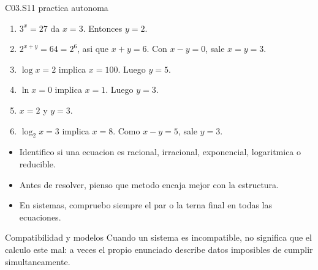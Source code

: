 \begin{fullsolution}{C03.S11 practica autonoma}
\begin{enumerate}[label=\textbf{PX-C03.S11-\arabic*:}, leftmargin=*]
  \item \(3^x=27\) da \(x=3\). Entonces \(y=2\).
  \item \(2^{x+y}=64=2^6\), asi que \(x+y=6\). Con \(x-y=0\), sale \(x=y=3\).
  \item \(\log x=2\) implica \(x=100\). Luego \(y=5\).
  \item \(\ln x=0\) implica \(x=1\). Luego \(y=3\).
  \item \(x=2\) y \(y=3\).
  \item \(\log_2 x=3\) implica \(x=8\). Como \(x-y=5\), sale \(y=3\).
\end{enumerate}
\end{fullsolution}

\begin{selfcheck}
\begin{itemize}
  \item Identifico si una ecuacion es racional, irracional, exponencial, logaritmica o reducible.
  \item Antes de resolver, pienso que metodo encaja mejor con la estructura.
  \item En sistemas, compruebo siempre el par o la terna final en todas las ecuaciones.
\end{itemize}
\end{selfcheck}

\begin{extension}{Compatibilidad y modelos}
Cuando un sistema es incompatible, no significa que el calculo este mal: a veces el propio
enunciado describe datos imposibles de cumplir simultaneamente.
\end{extension}

